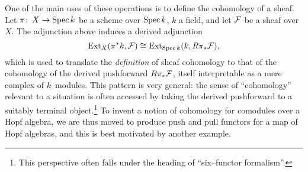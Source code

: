 One of the main uses of these operations is to define the cohomology of a sheaf.  Let $\pi\colon\thinspace X \to \operatorname{Spec} k$ be a scheme over $\operatorname{Spec} k$, $k$ a field, and let $\mathcal{F}$ be a sheaf over $X$.  The adjunction above induces a derived adjunction \[\operatorname{Ext}_X(\pi^* k, \mathcal{F}) \cong \operatorname{Ext}_{\operatorname{Spec} k}(k, R\pi_* \mathcal{F}),\] which is used to translate the \emph{definition} of sheaf cohomology to that of the cohomology of the derived pushforward $R\pi_* \mathcal{F}$, itself interpretable as a mere complex of $k$--modules.  This pattern is very general: the sense of ``cohomology'' relevant to a situation is often accessed by taking the derived pushforward to a suitably terminal object.\footnote{This perspective often falls under the heading of ``six--functor formalism''.}  To invent a notion of cohomology for comodules over a Hopf algebra, we are thus moved to produce push and pull functors for a map of Hopf algebras, and this is best motivated by another example.

